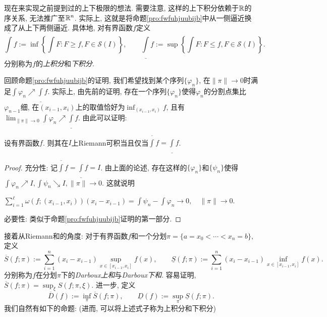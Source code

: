 现在来实现之前提到过的上下极限的想法. 需要注意, 这样的上下积分依赖于$\mathbb{R}$的序关系, 无法推广至$\mathbb{R} ^n$. 实际上, 这就是将命题\ref{pro:fwfuhjuubijb}中从一侧逼近换成了从上下两侧逼近. 具体地, 对有界函数$f$定义$$\overline{\int}f := \inf \left\{ \int F:F \geq f,F \in \mathcal{S}(I) \right\},\qquad \underline{\int}f := \sup \left\{ \int F:F \leq f,F \in \mathcal{S}(I) \right\}.$$
分别称为$f$的\textit{上积分}和\textit{下积分}. 

回顾命题\ref{pro:fwfuhjuubijb}的证明, 我们希望找到某个序列$\{ \varphi _n \}$, 在$\| \pi \| \to 0$时满足$\int \varphi _n \nearrow \underline{\int}f$. 实际上, 由先前的证明, 存在一个序列$\{ \varphi _n \}$使得$\varphi _n$的分割点集比$\varphi _{n-1}$细, 在$(x_{i-1},x_i)$上的取值恰好为$\inf_{(x_{i-1},x_i)}f$, 且有$\lim_{\| \pi \|\to 0} \int \varphi _n \nearrow \underline{\int}f$. 由此可以证明: 

\begin{proposition}{}
	设有界函数$f$. 则其在$I$上Riemann可积当且仅当$\overline{\int}f=\underline{\int}f$. 
\end{proposition}
\begin{proof}
	充分性: 记$\overline{\int}f=\underline{\int}f=I$. 由上面的论述, 存在这样的$\{ \varphi _n \}$和$\{ \psi _n \}$使得$\int \varphi _n \nearrow I, \int \psi _n \searrow I,\| \pi \| \to 0$. 这就说明
	\begin{center}
		$\displaystyle \sum_{i=1}^{\ell} \omega (f;(x_{i-1},x_i)) (x_i-x_{i-1}) = \int \psi _n - \int \varphi _n \to 0, \quad \| \pi \| \to 0.$
	\end{center}
	
	必要性: 类似于命题\ref{pro:fwfuhjuubijb}证明的第一部分. 
\end{proof}


接着从Riemann和的角度: 对于有界函数$f$和一个分划$\pi =\{ a=x_0<\cdots <x_n=b \}$, 定义$$\overline{S}(f;\pi):=\sum_{i=1}^{n}(x_i-x_{i-1})\sup_{x\in[x_{i-1},x_i]}f(x),\qquad \underline{S}(f;\pi):=\sum_{i=1}^{n}(x_i-x_{i-1})\inf_{x\in[x_{i-1},x_i]}f(x).$$
分别称为$f$在分划$\pi$下的\textit{Darboux上和}与\textit{Darboux下和}. 容易证明, $\overline{S}(f;\pi) = \sup_{\xi} S(f;\pi,\xi)$. 进一步, 定义$$\overline{D}(f) := \inf_{\pi} \overline{S}(f;\pi),\qquad \underline{D}(f) := \sup_{\pi} \underline{S}(f;\pi).$$
我们自然有如下的命题: (进而, 可以将上述式子称为上积分和下积分)

